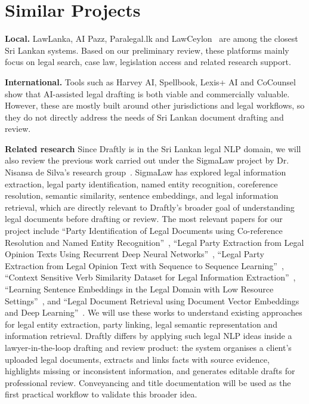 \documentclass[11pt,a4paper]{article}
\begin{document}
\section{Similar Projects}

\noindent\textbf{Local.}
LawLanka, AI Pazz, Paralegal.lk and
LawCeylon~\cite{lawlanka,aipazz,paralegal,lawceylon}
are among the closest Sri Lankan systems.
Based on our preliminary review, these platforms mainly focus on legal search, case
law, legislation access and related research support.

\noindent\textbf{International.} Tools such as
Harvey AI, Spellbook, Lexis+ AI and
CoCounsel~\cite{harvey,spellbook,lexisai,cocounsel}
show that AI-assisted legal drafting is both viable and commercially valuable.
However, these are mostly built around other jurisdictions and legal workflows, so they
do not directly address the needs of Sri Lankan document drafting and review.

\noindent\textbf{Related research} Since Draftly is in the Sri Lankan
legal NLP domain, we will also review the previous work carried out under the SigmaLaw
project by Dr. Nisansa de Silva's research group~\cite{sigmalaw}. SigmaLaw has explored
legal information extraction, legal party identification, named entity recognition,
coreference resolution, semantic similarity, sentence embeddings, and legal information
retrieval, which are directly relevant to Draftly's broader goal of understanding legal
documents before drafting or review. The most relevant papers for our project include
``Party Identification of Legal Documents using Co-reference Resolution and Named Entity
Recognition''~\cite{sigmaparty}, ``Legal Party Extraction from Legal Opinion Texts
Using Recurrent Deep Neural Networks''~\cite{sigmarnn}, ``Legal Party Extraction from
Legal Opinion Text with Sequence to Sequence Learning''~\cite{sigmaseq2seq}, ``Context
Sensitive Verb Similarity Dataset for Legal Information Extraction''~\cite{sigmaverbsim},
``Learning Sentence Embeddings in the Legal Domain with Low Resource
Settings''~\cite{sigmasentemb}, and ``Legal Document Retrieval using Document Vector
Embeddings and Deep Learning''~\cite{sigmaretrieval}. We will use these works to
understand existing approaches for legal entity extraction, party linking, legal
semantic representation and information retrieval. Draftly differs by applying such
legal NLP ideas inside a lawyer-in-the-loop drafting and review product: the system
organises a client's uploaded legal documents, extracts and links facts with source
evidence, highlights missing or inconsistent information, and generates editable drafts
for professional review. Conveyancing and title documentation will be used as the first
practical workflow to validate this broader idea.
\end{document}
